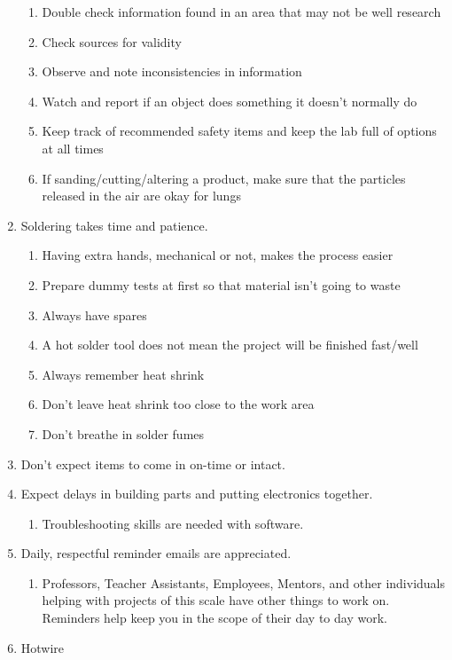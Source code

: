 ﻿\documentclass{article}
\begin{document}
\begin{enumerate}
\begin{enumerate}
\item Double check information found in an area that may not be well research
\item Check sources for validity
\item Observe and note inconsistencies in information
\item Watch and report if an object does something it doesn't normally do
\item Keep track of recommended safety items and keep the lab full of options at all times
\item If sanding/cutting/altering a product, make sure that the particles released in the air are okay for lungs
\end{enumerate}
\item Soldering takes time and patience.
\begin{enumerate}
\item Having extra hands, mechanical or not, makes the process easier
\item Prepare dummy tests at first so that material isn't going to waste
\item Always have spares
\item A hot solder tool does not mean the project will be finished fast/well
\item Always remember heat shrink
\item Don't leave heat shrink too close to the work area
\item Don't breathe in solder fumes
\end{enumerate}
\item Don't expect items to come in on-time or intact. 
\item Expect delays in building parts and putting electronics together.
\begin{enumerate}
\item Troubleshooting skills are needed with software.
\end{enumerate}
\item Daily, respectful reminder emails are appreciated.
\begin{enumerate}
\item Professors, Teacher Assistants, Employees, Mentors, and other individuals helping with projects of this scale have other things to work on. Reminders help keep you in the scope of their day to day work.
\end{enumerate}
\item Hotwire
\begin{enumerate}

\end{enumerate}
\end{enumerate}
\end{document}
